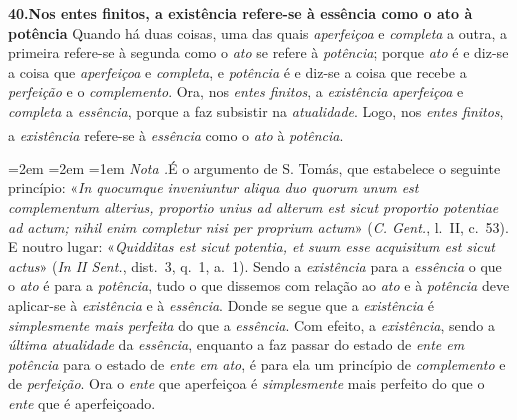 \documentclass[12pt,a4paper]{article}
\newcommand{\tese}[2]{\bigskip\noindent\textbf{#1.\quad #2}\;\textemdash\;}
\renewcommand\footnote[1]{%
    \stepcounter{footnote}\textsuperscript{\thefootnote}%
    \par
    {\footnotesize
     \leftskip=2em \rightskip=2em \parindent=1em
     \addvspace{\medskipamount}%
     \noindent\textit{Nota \thefootnote.}\enspace #1\par
     \addvspace{\medskipamount}}%
  }
\begin{document}
\tese{40}{Nos entes finitos, a existência refere-se à essência como o ato à
potência} Quando há duas coisas, uma das quais \emph{aperfeiçoa} e
\emph{completa} a outra, a primeira refere-se à segunda como o \emph{ato} se
refere à \emph{potência}; porque \emph{ato} é e diz-se a coisa que
\emph{aperfeiçoa} e \emph{completa}, e \emph{potência} é e diz-se a coisa que
recebe a \emph{perfeição} e o \emph{complemento}. Ora, nos \emph{entes finitos},
a \emph{existência} \emph{aperfeiçoa} e \emph{completa} a \emph{essência},
porque a faz subsistir na \emph{atualidade}. Logo, nos \emph{entes finitos}, a
\emph{existência} refere-se à \emph{essência} como o \emph{ato} à
\emph{potência}.\footnote{É o argumento de S. Tomás, que estabelece o seguinte
princípio: «\textit{In quocumque inveniuntur aliqua duo quorum unum est
complementum alterius, proportio unius ad alterum est sicut proportio potentiae
ad actum; nihil enim completur nisi per proprium actum}» (\emph{C. Gent.},
l.~II, c.~53). \textemdash{} E noutro lugar: «\textit{Quidditas est sicut
potentia, et suum esse acquisitum est sicut actus}» (\emph{In II Sent.},
dist.~3, q.~1, a.~1). \textemdash{} Sendo a \emph{existência} para a
\emph{essência} o que o \emph{ato} é para a \emph{potência}, tudo o que
dissemos com relação ao \emph{ato} e à \emph{potência} deve aplicar-se à
\emph{existência} e à \emph{essência}. \textemdash{} Donde se segue que a
\emph{existência} é \emph{simplesmente mais perfeita} do que a \emph{essência}.
Com efeito, a \emph{existência}, sendo a \emph{última atualidade} da
\emph{essência}, enquanto a faz passar do estado de \emph{ente em potência}
para o estado de \emph{ente em ato}, é para ela um princípio de
\emph{complemento} e de \emph{perfeição}. Ora o \emph{ente} que aperfeiçoa é
\emph{simplesmente} mais perfeito do que o \emph{ente} que é aperfeiçoado.

}
\end{document}
